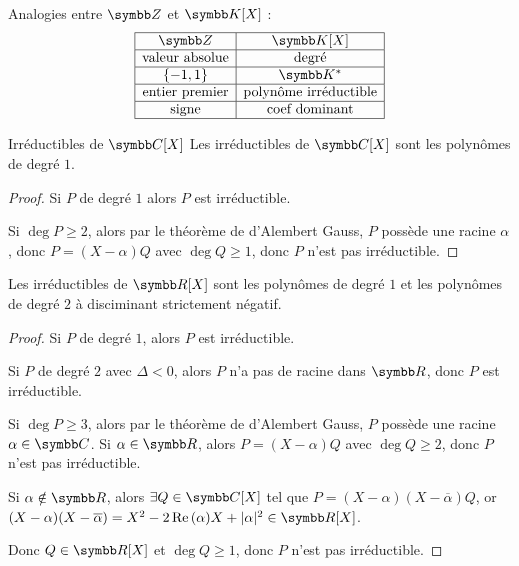 \begin{remarque}
    Analogies entre $\Z$ et $\K[X]$ :
    \[\begin{array}{|c|c|}
        \hline
        \Z & \K[X] \\
        \hline
        \text{valeur absolue} & \text{degré} \\
        \hline 
        \{-1, 1\} & \K^* \\
        \hline
        \text{entier premier} & \text{polynôme irréductible} \\
        \hline
        \text{signe} & \text{coef dominant} \\
        \hline
    \end{array}\]
\end{remarque}

\begin{theoreme}{Irréductibles de $\C[X]$}{}
    Les irréductibles de $\C[X]$ sont les polynômes de degré $1$.
\end{theoreme}

\begin{proof}
    Si $P$ de degré $1$ alors $P$ est irréductible.

    Si $\deg P \geqslant 2$, alors par le théorème de d'Alembert Gauss, 
    $P$ possède une racine $\alpha$, donc $P = (X - \alpha) Q$ avec $\deg Q \geqslant 1$, donc
    $P$ n'est pas irréductible.
\end{proof}

\begin{theoreme}{}{}
    Les irréductibles de $\R[X]$ sont les polynômes de degré $1$ et les polynômes
    de degré $2$ à disciminant strictement négatif.
\end{theoreme}

\begin{proof}
    Si $P$ de degré $1$, alors $P$ est irréductible.

    \avspace Si $P$ de degré $2$ avec $\Delta < 0$, alors $P$ n'a pas de racine dans $\R$, donc 
    $P$ est irréductible.

    \avspace Si $\deg P \geqslant 3$, alors par le théorème de d'Alembert Gauss, 
    $P$ possède une racine $\alpha \in \C$. Si $\alpha \in \R$, alors $P = (X - \alpha) Q$ avec $\deg Q \geqslant 2$, donc
    $P$ n'est pas irréductible.

    Si $\alpha \notin \R$, alors $\exists Q \in \C[X]$ tel que $P = (X - \alpha)(X - \overline \alpha) Q$, 
    or $(X - \alpha)(X - \overline \alpha) = X^2 - 2 \re(\alpha) X + |\alpha|^2 \in \R[X]$.

    Donc $Q \in \R[X]$ et $\deg Q \geqslant 1$, donc $P$ n'est pas irréductible.
\end{proof}

